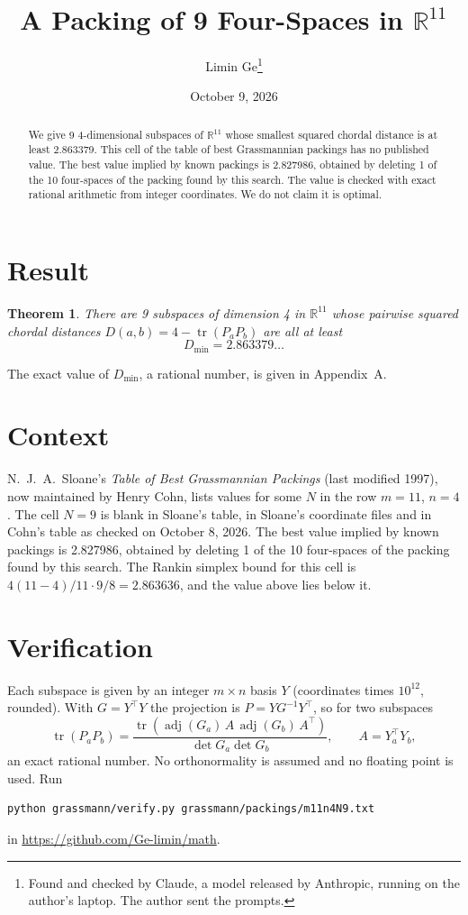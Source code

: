 \documentclass[11pt,a4paper]{article}
\title{A Packing of 9 Four-Spaces in $\mathbb{R}^{11}$}
\author{Limin Ge\thanks{Found and checked by Claude, a model released by Anthropic, running on the author's laptop. The author sent the prompts.}}
\date{October 9, 2026}
\newtheorem*{theorem}{Theorem}
\begin{document}
\maketitle
\begin{abstract}
We give 9 4-dimensional subspaces of $\mathbb{R}^{11}$ whose smallest squared chordal distance is at least 2.863379. This cell of the table of best Grassmannian packings has no published value. The best value implied by known packings is 2.827986, obtained by deleting 1 of the 10 four-spaces of the packing found by this search. The value is checked with exact rational arithmetic from integer coordinates. We do not claim it is optimal.
\end{abstract}

\section{Result}
\begin{theorem}
There are 9 subspaces of dimension 4 in $\mathbb{R}^{11}$ whose pairwise squared chordal distances $D(a,b) = 4 - \operatorname{tr}(P_aP_b)$ are all at least
\[ D_{\min} = 2.863379\ldots \]
\end{theorem}
The exact value of $D_{\min}$, a rational number, is given in Appendix~A.


\section{Context}
N.~J.~A.~Sloane's \emph{Table of Best Grassmannian Packings} (last modified 1997), now maintained by Henry Cohn, lists values for some $N$ in the row $m=11$, $n=4$. The cell $N=9$ is blank in Sloane's table, in Sloane's coordinate files and in Cohn's table as checked on October 8, 2026. The best value implied by known packings is 2.827986, obtained by deleting 1 of the 10 four-spaces of the packing found by this search. The Rankin simplex bound for this cell is $4(11-4)/11\cdot 9/8 = 2.863636$, and the value above lies below it.


\section{Verification}
Each subspace is given by an integer $m\times n$ basis $Y$ (coordinates times $10^{12}$, rounded). With $G=Y^\top Y$ the projection is $P=YG^{-1}Y^\top$, so for two subspaces
\[ \operatorname{tr}(P_aP_b)=\frac{\operatorname{tr}(\operatorname{adj}(G_a)\,A\,\operatorname{adj}(G_b)\,A^\top)}{\det G_a\det G_b},\qquad A=Y_a^\top Y_b, \]
an exact rational number. No orthonormality is assumed and no floating point is used. Run
\begin{verbatim}
python grassmann/verify.py grassmann/packings/m11n4N9.txt
\end{verbatim}
in \url{https://github.com/Ge-limin/math}.
\end{document}
